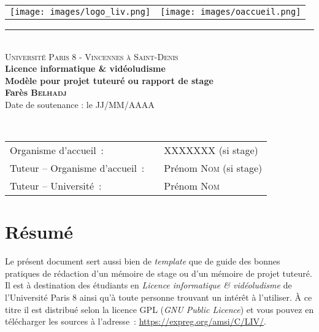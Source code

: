 \documentclass[a4paper, 12pt]{book}
\begin{document}
\begin{titlepage}
  \begin{center}
    \begin{tabular*}{\textwidth}{l@{\extracolsep{\fill}}r}
      \texttt{[image: images/logo\_liv.png]}&
      \texttt{[image: images/oaccueil.png]}
    \end{tabular*}
    \small 
    \rule{\textwidth}{.5pt}~\\
    \large 
    \textsc{Université Paris 8 - Vincennes à Saint-Denis}\vspace{0.5cm}\\
    \textbf{Licence informatique \& vidéoludisme}\vspace{3.0cm}\\
    \Large
    \textbf{Modèle pour projet tuteuré ou rapport de stage}\vspace{1.5cm}\\
    \large
    \textbf{Farès \textsc{Belhadj}}\vspace{1.5cm}\\
    Date de soutenance : le JJ/MM/AAAA\vspace{1.75cm}\\
  \end{center}\vspace{1.5cm}~\\
  \begin{tabular}{ll}
    \hspace{-0.45cm}Organisme d'accueil~:~&~XXXXXXX (si stage)\\
    \hspace{-0.45cm}Tuteur -- Organisme d'accueil~:~&~Prénom \textsc{Nom} (si stage)\\
    \hspace{-0.45cm}Tuteur -- Université~:~&~Prénom \textsc{Nom}\\
  \end{tabular}
\end{titlepage}
\frontmatter
\chapter*{Résumé}

Le présent document sert aussi bien de \emph{template} que de guide
des bonnes pratiques de rédaction d'un mémoire de stage ou d'un
mémoire de projet tuteuré. Il est à destination des étudiants en
\emph{Licence informatique \& vidéoludisme} de l'Université
Paris 8 ainsi qu'à toute personne trouvant un intérêt à
l'utiliser. \`A ce titre il est distribué selon la licence GPL
(\emph{GNU Public Licence}) et vous pouvez en télécharger les sources
à l'adresse~: \url{https://expreg.org/amsi/C/LIV/}.\\
\end{document}
